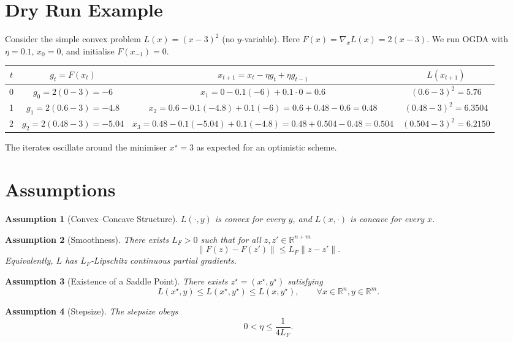 \documentclass{article}
\newtheorem{assumption}{Assumption}
\newcommand{\R}{\mathbb{R}}
\begin{document}
\section*{Dry Run Example}
Consider the simple convex problem $L(x)= (x-3)^{2}$ (no $y$-variable).  
Here $F(x)=\nabla_x L(x)=2(x-3)$.  
We run OGDA with $\eta=0.1$, $x_{0}=0$, and initialise $F(x_{-1})=0$.

\begin{center}
\begin{tabular}{c|c|c|c}
$t$ & $g_{t}=F(x_{t})$ & $x_{t+1}=x_{t}-\eta g_{t}+\eta g_{t-1}$ & $L(x_{t+1})$\\ \hline
0 & $g_{0}=2(0-3)=-6$ & $x_{1}=0-0.1(-6)+0.1\cdot0=0.6$ & $(0.6-3)^{2}=5.76$\\
1 & $g_{1}=2(0.6-3)=-4.8$ & $x_{2}=0.6-0.1(-4.8)+0.1(-6)=0.6+0.48-0.6=0.48$ & $(0.48-3)^{2}=6.3504$\\
2 & $g_{2}=2(0.48-3)=-5.04$ & $x_{3}=0.48-0.1(-5.04)+0.1(-4.8)=0.48+0.504-0.48=0.504$ & $(0.504-3)^{2}=6.2150$
\end{tabular}
\end{center}
The iterates oscillate around the minimiser $x^{\star}=3$ as expected for an optimistic scheme.

\newpage

\section*{Assumptions}
\begin{assumption}[Convex–Concave Structure]\label{ass:cc}
$L(\cdot,y)$ is convex for every $y$, and $L(x,\cdot)$ is concave for every $x$.
\end{assumption}
\begin{assumption}[Smoothness]\label{ass:smooth}
There exists $L_{F}>0$ such that for all $z,z'\in\R^{n+m}$
\[
\|F(z)-F(z')\|\le L_{F}\|z-z'\|.
\]
Equivalently, $L$ has $L_{F}$‑Lipschitz continuous partial gradients.
\end{assumption}
\begin{assumption}[Existence of a Saddle Point]\label{ass:saddle}
There exists $z^{\star}=(x^{\star},y^{\star})$ satisfying
\[
L(x^{\star},y)\le L(x^{\star},y^{\star})\le L(x,y^{\star}),\qquad\forall x\in\R^{n},y\in\R^{m}.
\]
\end{assumption}
\begin{assumption}[Stepsize]\label{ass:stepsize}
The stepsize obeys
\[
0<\eta\le\frac{1}{4L_{F}}.
\]
\end{assumption}
\end{document}
